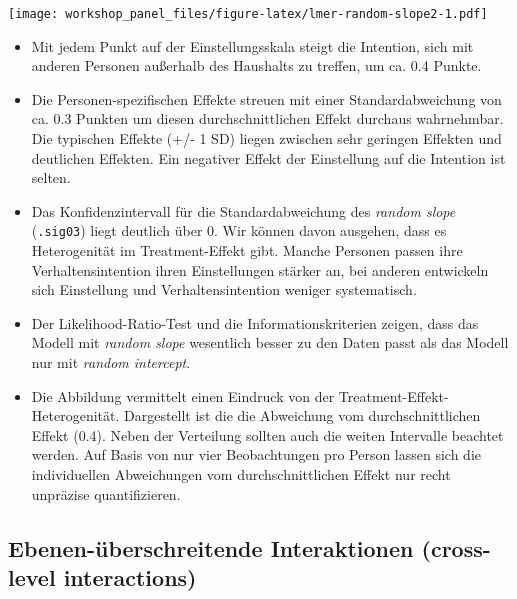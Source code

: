 \documentclass[
]{book}
\begin{document}
\texttt{[image: workshop\_panel\_files/figure-latex/lmer-random-slope2-1.pdf]}

\begin{itemize}
\item
  Mit jedem Punkt auf der Einstellungsskala steigt die Intention, sich mit anderen Personen außerhalb des Haushalts zu treffen, um ca. 0.4 Punkte.
\item
  Die Personen-spezifischen Effekte streuen mit einer Standardabweichung von ca. 0.3 Punkten um diesen durchschnittlichen Effekt durchaus wahrnehmbar. Die typischen Effekte (+/- 1 SD) liegen zwischen sehr geringen Effekten und deutlichen Effekten. Ein negativer Effekt der Einstellung auf die Intention ist selten.
\item
  Das Konfidenzintervall für die Standardabweichung des \emph{random slope} (\texttt{.sig03}) liegt deutlich über 0. Wir können davon ausgehen, dass es Heterogenität im Treatment-Effekt gibt. Manche Personen passen ihre Verhaltensintention ihren Einstellungen stärker an, bei anderen entwickeln sich Einstellung und Verhaltensintention weniger systematisch.
\item
  Der Likelihood-Ratio-Test und die Informationskriterien zeigen, dass das Modell mit \emph{random slope} wesentlich besser zu den Daten passt als das Modell nur mit \emph{random intercept}.
\item
  Die Abbildung vermittelt einen Eindruck von der Treatment-Effekt-Heterogenität. Dargestellt ist die die Abweichung vom durchschnittlichen Effekt (0.4). Neben der Verteilung sollten auch die weiten Intervalle beachtet werden. Auf Basis von nur vier Beobachtungen pro Person lassen sich die individuellen Abweichungen vom durchschnittlichen Effekt nur recht unpräzise quantifizieren.
\end{itemize}

\hypertarget{ebenen-uxfcberschreitende-interaktionen-cross-level-interactions}{%
\subsection*{Ebenen-überschreitende Interaktionen (cross-level interactions)}\label{ebenen-uxfcberschreitende-interaktionen-cross-level-interactions}}
\end{document}
